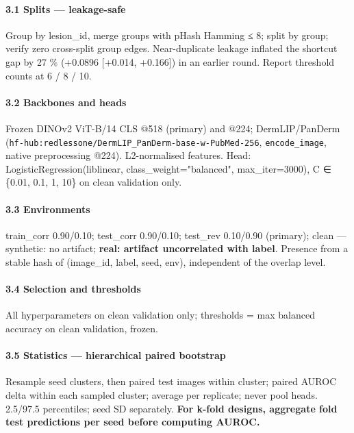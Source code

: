 {\paragraph{3.1 Splits --- leakage-safe}\label{31-splits--leakage-safe}

Group by lesion\_id, merge groups with pHash Hamming ≤ 8; split by group; verify zero cross-split group edges.
Near-duplicate leakage inflated the shortcut gap by 27 \% (+0.0896 {[}+0.014, +0.166{]}) in an earlier round.
Report threshold counts at 6 / 8 / 10.

\paragraph{3.2 Backbones and heads}\label{32-backbones-and-heads}

Frozen DINOv2 ViT-B/14 CLS @518 (primary) and @224; DermLIP/PanDerm (\texttt{hf-hub:redlessone/DermLIP\_PanDerm-base-w-PubMed-256},
\texttt{encode\_image}, native preprocessing @224). L2-normalised features. Head: LogisticRegression(liblinear,
class\_weight="balanced", max\_iter=3000), C ∈ \{0.01, 0.1, 1, 10\} on clean validation only.

\paragraph{3.3 Environments}\label{33-environments}

train\_corr 0.90/0.10; test\_corr 0.90/0.10; test\_rev 0.10/0.90 (primary); clean --- synthetic: no artifact;
\textbf{real: artifact uncorrelated with label}. Presence from a stable hash of (image\_id, label, seed, env),
independent of the overlap level.

\paragraph{3.4 Selection and thresholds}\label{34-selection-and-thresholds}

All hyperparameters on clean validation only; thresholds = max balanced accuracy on clean validation, frozen.

\paragraph{3.5 Statistics --- hierarchical paired bootstrap}\label{35-statistics--hierarchical-paired-bootstrap}

Resample seed clusters, then paired test images within cluster; paired AUROC delta within each sampled
cluster; average per replicate; never pool heads. 2.5/97.5 percentiles; seed SD separately. \textbf{For k-fold
designs, aggregate fold test predictions per seed before computing AUROC.}

}
